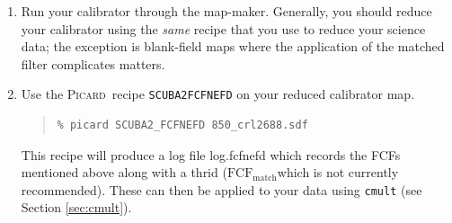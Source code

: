 \documentclass[twoside,11pt]{article}
\newcommand{\xref}[3]{#1}
\renewcommand{\_}{\texttt{\symbol{95}}}
\newenvironment{myquote}{\begin{quote}\begin{small}}{\end{small}\end{quote}}
\newcommand{\fcfm}{$\mathrm{FCF_{match}}$}
\newcommand{\picard}{\xref{\textsc{Picard}}{sun231}{}}
\begin{document}
\begin{enumerate}
\item Run your calibrator through the map-maker. Generally, you should reduce your calibrator using the \emph{same} recipe that you use to reduce your science data; the exception is blank-field maps where the application of the matched filter complicates matters.

\item Use the \picard\ recipe \texttt{SCUBA2\_FCFNEFD} on your reduced calibrator map. 
\begin{myquote}
\begin{verbatim}
% picard SCUBA2_FCFNEFD 850_crl2688.sdf
\end{verbatim}
\end{myquote}
This recipe will produce a log file log.fcfnefd which records the FCFs mentioned above along with a thrid (\fcfm which is not currently recommended). These can then be applied to your data using \texttt{cmult} (see Section \ref{sec:cmult}).
\end{enumerate}


\clearpage
\end{document}
